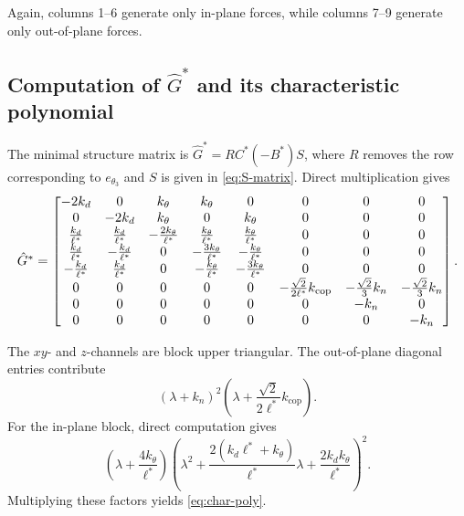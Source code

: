 \documentclass[letterpaper,journal]{IEEEtran}
\theoremstyle{plain}
\theoremstyle{definition}
\theoremstyle{remark}
\begin{document}
Again, columns 1--6 generate only in-plane forces, while columns 7--9 generate only out-of-plane forces.

\subsection{Computation of \(\hat G^*\) and its characteristic polynomial}
\label{app:Gstar}

The minimal structure matrix is \(\hat G^*=R C^*(-B^*)S\), where \(R\) removes the row corresponding to \(e_{\theta_3}\) and \(S\) is given in \eqref{eq:S-matrix}. Direct multiplication gives
\begin{equation}
\resizebox{\columnwidth}{!}{$
\hat G^*=
\begin{bmatrix}
-2k_d&0&k_\theta&k_\theta&0&0&0&0\\
0&-2k_d&k_\theta&0&k_\theta&0&0&0\\
\frac{k_d}{\ell^*}&\frac{k_d}{\ell^*}&-\frac{2k_\theta}{\ell^*}&\frac{k_\theta}{\ell^*}&\frac{k_\theta}{\ell^*}&0&0&0\\
\frac{k_d}{\ell^*}&-\frac{k_d}{\ell^*}&0&-\frac{3k_\theta}{\ell^*}&-\frac{k_\theta}{\ell^*}&0&0&0\\
-\frac{k_d}{\ell^*}&\frac{k_d}{\ell^*}&0&-\frac{k_\theta}{\ell^*}&-\frac{3k_\theta}{\ell^*}&0&0&0\\
0&0&0&0&0&-\frac{\sqrt2}{2\ell^*}k_{\mathrm{cop}}&-\frac{\sqrt2}{3}k_n&-\frac{\sqrt2}{3}k_n\\
0&0&0&0&0&0&-k_n&0\\
0&0&0&0&0&0&0&-k_n
\end{bmatrix}.
$}
\end{equation}

The \(xy\)- and \(z\)-channels are block upper triangular. The out-of-plane diagonal entries contribute
\[
(\lambda+k_n)^2\left(\lambda+\frac{\sqrt2}{2\ell^*}k_{\mathrm{cop}}\right).
\]
For the in-plane block, direct computation gives
\[
\left(\lambda+\frac{4k_\theta}{\ell^*}\right)
\left(\lambda^2+\frac{2(k_d\ell^*+k_\theta)}{\ell^*}\lambda+\frac{2k_d k_\theta}{\ell^*}\right)^2.
\]
Multiplying these factors yields \eqref{eq:char-poly}.
\end{document}
